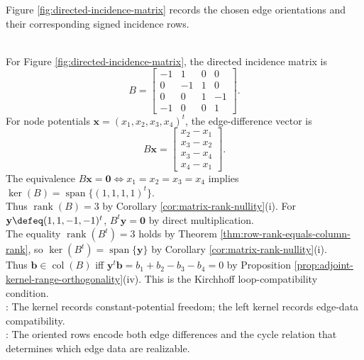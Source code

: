 Figure \ref{fig:directed-incidence-matrix} records the chosen edge orientations and their corresponding signed incidence rows.

\begin{illustrationfigure}[H]
  \centering
  
  \caption{A directed incidence matrix records oriented edge differences from vertices to edges.}
  \label{fig:directed-incidence-matrix}
\end{illustrationfigure}

\begin{example} \label{ex:directed-incidence-matrix-four-node} \\
For Figure \ref{fig:directed-incidence-matrix}, the directed incidence matrix is
\begin{displaymath}
B=
\begin{bmatrix}
-1 & 1 & 0 & 0\\
0 & -1 & 1 & 0\\
0 & 0 & 1 & -1\\
-1 & 0 & 0 & 1
\end{bmatrix}.
\end{displaymath}
For node potentials $\mathbf{x}=(x_1,x_2,x_3,x_4)^t$, the edge-difference vector is
\begin{displaymath}
B\mathbf{x}=
\begin{bmatrix}
x_2-x_1\\
x_3-x_2\\
x_3-x_4\\
x_4-x_1
\end{bmatrix}.
\end{displaymath}
The equivalence $B\mathbf{x}=\mathbf{0}\Longleftrightarrow x_1=x_2=x_3=x_4$ implies $\ker(B)=\operatorname{span}\{(1,1,1,1)^t\}$.\\
Thus $\operatorname{rank}(B)=3$ by Corollary \ref{cor:matrix-rank-nullity}(i). For $\mathbf{y}\defeq(1,1,-1,-1)^t$, $B^t\mathbf{y}=\mathbf{0}$ by direct multiplication.\\
The equality $\operatorname{rank}(B^t)=3$ holds by Theorem \ref{thm:row-rank-equals-column-rank}, so $\ker(B^t)=\operatorname{span}\{\mathbf{y}\}$ by Corollary \ref{cor:matrix-rank-nullity}(i).\\
Thus $\mathbf{b}\in\operatorname{col}(B)$ iff $\mathbf{y}^t\mathbf{b}=b_1+b_2-b_3-b_4=0$ by Proposition \ref{prop:adjoint-kernel-range-orthogonality}(iv). This is the Kirchhoff loop-compatibility condition.\\
: The kernel records constant-potential freedom; the left kernel records edge-data compatibility.\\
: The oriented rows encode both edge differences and the cycle relation that determines which edge data are realizable.
\end{example}

